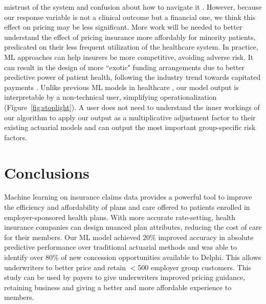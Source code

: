 \documentclass[letterpaper]{article}
\begin{document}
mistrust of the system and confusion about how to navigate it \cite{RacialBias}. However, because our response variable is not a clinical outcome but a financial one, we think this effect on pricing may be less significant.  More work will be needed to better understand the effect of pricing insurance more affordably for minority patients, predicated on their less frequent utilization of the healthcare system.  In practice, ML approaches can help insurers be more competitive, avoiding adverse risk. It can result in the design of more ``exotic" funding arrangements due to better predictive power of patient health, following the industry trend towards capitated payments \cite{mngdcare}.  Unlike previous ML models in healthcare \cite{xai}, our model output is interpretable by a non-technical user, simplifying operationalization (Figure~\ref{fig:stoplight}). A user does not need to understand the inner workings of our algorithm to apply our output as a multiplicative adjustment factor to their existing actuarial models and can output the most important group-specific risk factors.

\vspace{-3.63mm}
\section*{Conclusions}
Machine learning on insurance claims data provides a powerful tool to improve the efficiency and affordability of plans and care offered to patients enrolled in employer-sponsored health plans. With more accurate rate-setting, health insurance companies can design nuanced plan attributes, reducing the cost of care for their members. Our ML model achieved 20\% improved accuracy in absolute predictive performance over traditional actuarial methods and was able to identify over 80\% of new concession opportunities available to Delphi. This allows underwriters to better price and retain $<$500 employer group customers. This study can be used by payers to give underwriters improved pricing guidance, retaining business and giving a better and more affordable experience to members.

\vspace{-3.58mm}
\end{document}

